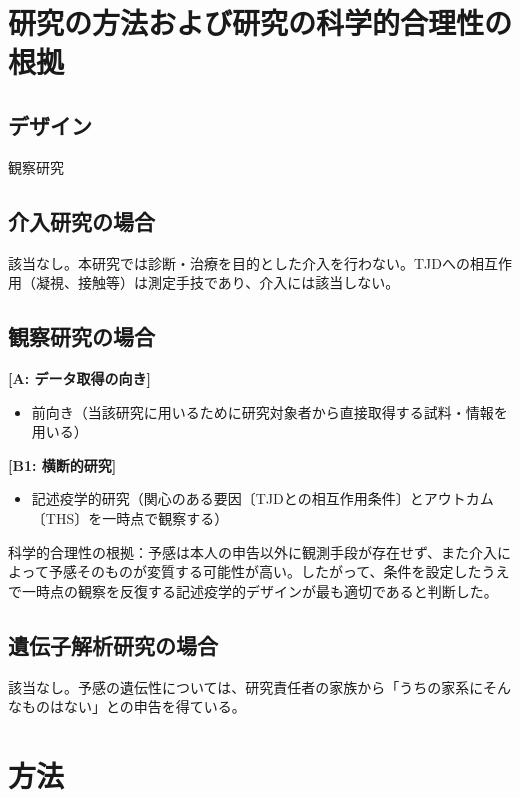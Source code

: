 \documentclass{kyodai-protocol}
\begin{document}
\section{研究の方法および研究の科学的合理性の根拠}
\label{sec:methods}

\subsection{デザイン}

観察研究

\subsection{介入研究の場合}

該当なし。本研究では診断・治療を目的とした介入を行わない。TJDへの相互作用（凝視、接触等）は測定手技であり、介入には該当しない。

\subsection{観察研究の場合}

\textbf{[A: データ取得の向き]}
\begin{itemize}
\item 前向き（当該研究に用いるために研究対象者から直接取得する試料・情報を用いる）
\end{itemize}

\textbf{[B1: 横断的研究]}
\begin{itemize}
\item 記述疫学的研究（関心のある要因〔TJDとの相互作用条件〕とアウトカム〔THS〕を一時点で観察する）
\end{itemize}

科学的合理性の根拠：予感は本人の申告以外に観測手段が存在せず、また介入によって予感そのものが変質する可能性が高い。したがって、条件を設定したうえで一時点の観察を反復する記述疫学的デザインが最も適切であると判断した。

\subsection{遺伝子解析研究の場合}

該当なし。予感の遺伝性については、研究責任者の家族から「うちの家系にそんなものはない」との申告を得ている。

\section{方法}
\end{document}
